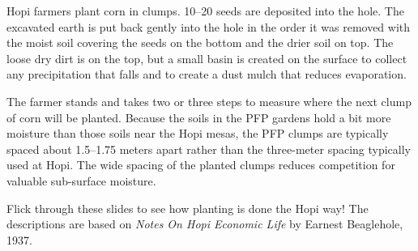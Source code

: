 \documentclass[12pt,]{article}
\begin{document}
Hopi farmers plant corn in clumps. 10--20 seeds are deposited into the hole. The excavated earth is put back gently into the hole in the order it was removed with the moist soil covering the seeds on the bottom and the drier soil on top. The loose dry dirt is on the top, but a small basin is created on the surface to collect any precipitation that falls and to create a dust mulch that reduces evaporation.

The farmer stands and takes two or three steps to measure where the next clump of corn will be planted. Because the soils in the PFP gardens hold a bit more moisture than those soils near the Hopi mesas, the PFP clumps are typically spaced about 1.5--1.75 meters apart rather than the three-meter spacing typically used at Hopi. The wide spacing of the planted clumps reduces competition for valuable sub-surface moisture.

Flick through these slides to see how planting is done the Hopi way! The descriptions are based on \emph{Notes On Hopi Economic Life} by Earnest Beaglehole, 1937.
\end{document}
